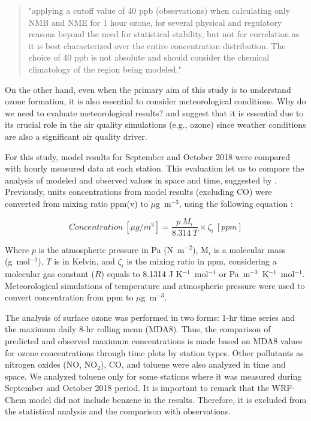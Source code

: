   \begin{quote}
  	"applying a cutoff value of 40 ppb (observations) when calculating only NMB and NME for 1 hour ozone, for several physical and regulatory reasons beyond the need for statistical stability, but not for correlation as it is best characterized over the entire concentration distribution. The choice of 40 ppb is not absolute and should consider the chemical climatology of the region being modeled."
  \end{quote}
  
  On the other hand, even when the primary aim of this study is to understand ozone formation, it is also essential to consider meteorological conditions.
  Why do we need to evaluate meteorological results?  \citet{Emery2017} and \citet{Monk2019} suggest that it is essential due to its crucial role in the air quality simulations (e.g., ozone) since weather conditions are also a significant air quality driver.
  
  For this study, model results for September and October 2018 were compared with hourly measured data at each station.
  This evaluation let us to compare the analysis of modeled and observed values in space and time, suggested by \citet{Seinfeld2016}.
  Previously, units concentrations from model results (excluding CO) were converted from mixing ratio ppm(v) to $\mu$g~m$^{-3}$, using the following equation \citep{Seinfeld2016}:
  
  \begin{equation}
	Concentration ~[\mu g/m^3] = \frac{p ~M_i}{8.314~ T}\times \zeta _i ~[ppm] \label{eq:conv}
 \end{equation}
  
  Where $p$ is the atmospheric pressure in Pa (N~m$^{-2}$), M$_i$ is a molecular mass (g~mol$^{-1}$), $T$ is in Kelvin, and $\zeta _i$ is the mixing ratio in ppm, considering a molecular gas constant ($R$) equals to 8.1314 J K$^{-1}$~mol$^{-1}$ or Pa~m$^{-3}$~K$^{-1}$~mol$^{-1}$.
  Meteorological simulations of temperature and atmospheric pressure were used to convert concentration from ppm to $\mu$g~m$^{-3}$.
  
   The analysis of surface ozone was performed in two forms: 1-hr time series and the maximum daily 8-hr rolling mean (MDA8).
   Thus, the comparison of predicted and observed maximum concentrations is made based on MDA8 values for ozone concentrations through time plots by station types.
  Other pollutants as nitrogen oxides (NO, NO$_2$), CO, and toluene were also analyzed in time and space.
  We analyzed toluene only for some stations where it was measured during September and October 2018 period. 
  It is important to remark that the WRF-Chem model did not include benzene in the results.
  Therefore, it is excluded from the statistical analysis and the comparison with observations.
 
